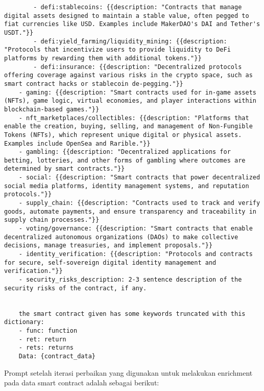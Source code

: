 \begin{lstlisting}
        - defi:stablecoins: {{description: "Contracts that manage digital assets designed to maintain a stable value, often pegged to fiat currencies like USD. Examples include MakerDAO's DAI and Tether's USDT."}}
        - defi:yield_farming/liquidity_mining: {{description: "Protocols that incentivize users to provide liquidity to DeFi platforms by rewarding them with additional tokens."}}
        - defi:insurance: {{description: "Decentralized protocols offering coverage against various risks in the crypto space, such as smart contract hacks or stablecoin de-pegging."}}
    - gaming: {{description: "Smart contracts used for in-game assets (NFTs), game logic, virtual economies, and player interactions within blockchain-based games."}}
    - nft_marketplaces/collectibles: {{description: "Platforms that enable the creation, buying, selling, and management of Non-Fungible Tokens (NFTs), which represent unique digital or physical assets. Examples include OpenSea and Rarible."}}
    - gambling: {{description: "Decentralized applications for betting, lotteries, and other forms of gambling where outcomes are determined by smart contracts."}}
    - social: {{description: "Smart contracts that power decentralized social media platforms, identity management systems, and reputation protocols."}}
    - supply_chain: {{description: "Contracts used to track and verify goods, automate payments, and ensure transparency and traceability in supply chain processes."}}
    - voting/governance: {{description: "Smart contracts that enable decentralized autonomous organizations (DAOs) to make collective decisions, manage treasuries, and implement proposals."}}
    - identity_verification: {{description: "Protocols and contracts for secure, self-sovereign digital identity management and verification."}}
    - security_risks_description: 2-3 sentence description of the security risks of the contract, if any.

    
    the smart contract given has some keywords truncated with this dictionary:
    - func: function
    - ret: return
    - rets: returns
    Data: {contract_data}
\end{lstlisting}

Prompt setelah iterasi perbaikan yang digunakan untuk melakukan enrichment pada data smart contract adalah sebagai berikut:

